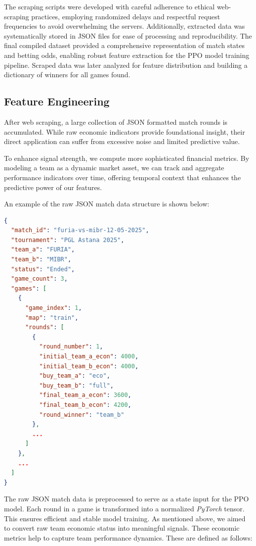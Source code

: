 \documentclass[sigconf]{acmart}
\begin{document}
\bigskip

The scraping scripts were developed with careful adherence to ethical web-scraping practices, employing randomized delays and respectful request frequencies to avoid overwhelming the servers. Additionally, extracted data was systematically stored in JSON files for ease of processing and reproducibility. The final compiled dataset provided a comprehensive representation of match states and betting odds, enabling robust feature extraction for the PPO model training pipeline. Scraped data was later analyzed for feature distribution and building a dictionary of winners for all games found.

\subsection{Feature Engineering}

After web scraping, a large collection of JSON formatted match rounds is accumulated. While raw economic indicators provide foundational insight, their direct application can suffer from excessive noise and limited predictive value.

To enhance signal strength, we compute more sophisticated financial metrics. By modeling a team as a dynamic market asset, we can track and aggregate performance indicators over time, offering temporal context that enhances the predictive power of our features.

An example of the raw JSON match data structure is shown below:

\begin{lstlisting}[language=json,firstnumber=1]
{
  "match_id": "furia-vs-mibr-12-05-2025",
  "tournament": "PGL Astana 2025",
  "team_a": "FURIA",
  "team_b": "MIBR",
  "status": "Ended",
  "game_count": 3,
  "games": [
    {
      "game_index": 1,
      "map": "train",
      "rounds": [
        {
          "round_number": 1,
          "initial_team_a_econ": 4000,
          "initial_team_b_econ": 4000,
          "buy_team_a": "eco",
          "buy_team_b": "full",
          "final_team_a_econ": 3600,
          "final_team_b_econ": 4200,
          "round_winner": "team_b"
        },
        ...
      ]
    },
    ...
  ]
}
\end{lstlisting}

The raw JSON match data is preprocessed to serve as a state input for the PPO model. Each round in a game is transformed into a normalized \textit{PyTorch} tensor. This ensures efficient and stable model training. As mentioned above, we aimed to convert raw team economic status into meaningful signals. These economic metrics help to capture team performance dynamics. These are defined as follows:
\end{document}
